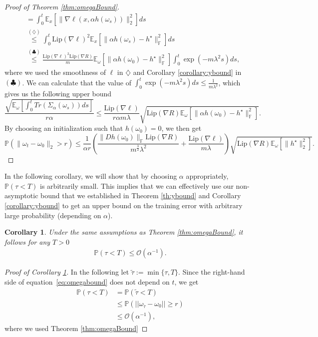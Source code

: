 \documentclass[10pt]{article} %
\def\eqref#1{equation~\ref{#1}}
\newcommand{\bE}{\mathbb{E}}
\newcommand{\bF}{\mathbb{F}}
\newcommand{\bP}{\mathbb{P}}
\newtheorem{corollary}{Corollary}
\begin{document}
\begin{proof}[Proof of Theorem \ref{thm:omegaBound}]
\begin{align*}
        &=\int_0^t\bE_x[\|\nabla \ell (x,\alpha h(\omega_s))\|_2^2]ds\\
        &\overset{(\diamondsuit)}{\leq} \int_0^t \mathrm{Lip}(\nabla\ell)^2\bE_x[\|\alpha h(\omega_s)-h^\star\|_\bF^2]ds\\
        &\overset{(\clubsuit)}{\leq}\frac{\mathrm{Lip}(\nabla\ell)^2\mathrm{Lip}(\nabla R)}{m}\bE_\omega[\|\alpha h(\omega_0)-h^\star\|_\bF^2]\int_0^t \exp(-m\lambda^2s)ds,
    \end{align*}
    where we used the smoothness of $\ell$ in $\diamondsuit$ and Corollary \ref{corollary:ybound} in $(\clubsuit)$. We can calculate that the value of $\int_0^t\exp(-m\lambda^2s)ds\leq \frac{1}{m\lambda^2}$, which gives us the following upper bound
    \begin{equation*}
        \frac{\sqrt{\bE_\omega\left[\int_0^tTr(\Sigma_\alpha(\omega_s))ds\right]}}{r\alpha}\leq \frac{\mathrm{Lip}(\nabla\ell)}{r\alpha m \lambda}\sqrt{\mathrm{Lip}(\nabla R)\bE_\omega[\|\alpha h(\omega_0)-h^\star\|_\bF^2]}.
    \end{equation*}
    By choosing an initialization such that $h(\omega_0)=0$, we then get 
    $$\bP(\|\omega_t-\omega_0\|_2>r)\leq\frac{1}{\alpha r}\left(\frac{\|Dh(\omega_0)\|_\bF \mathrm{Lip}(\nabla R)}{m^{\frac{3}{2}}\lambda^2}+\frac{\mathrm{Lip}(\nabla \ell)}{m\lambda}{}\right)\sqrt{\mathrm{Lip}(\nabla R)\bE_\omega [\|h^\star\|^2_2]}.$$
\end{proof}
In the following corollary, we will show that by choosing $\alpha$ appropriately, $\bP(\tau<T)$ is arbitrarily small. This implies that we can effectively use our non-asymptotic bound that we established in Theorem \ref{th:ybound} and Corollary \ref{corollary:ybound} to get an upper bound on the training error with arbitrary large probability (depending on $\alpha$). 
\begin{corollary}\label{corollary:infiniteEscape}
    Under the same assumptions as Theorem \ref{thm:omegaBound}, it follows for any $T>0$
    \begin{align}
        \bP(\tau<T)\leq\mathcal{O}(\alpha^{-1}).
    \end{align}
\end{corollary}
\begin{proof}[Proof of Corollary \ref{corollary:infiniteEscape}]
In the following let $\tilde{\tau}:=\min\{\tau,T\}$. Since the right-hand side of \eqref{eq:omegabound} does not depend on $t$, we get
    \begin{align*}
        \bP(\tau < T) &= \bP(\tilde{\tau} < T)\\
        &\leq\bP(||\omega_{\tilde{ \tau }}-\omega_0||\geq r)\\
        &\leq\mathcal{O}(\alpha^{-1}),
    \end{align*}
    where we used Theorem \ref{thm:omegaBound}
\end{proof}
\end{document}
